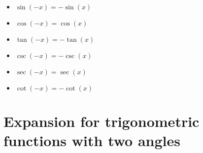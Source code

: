 \documentclass{article}
\begin{document}
\begin{itemize}
\item $\sin(-x) = -\sin(x)$
\item $\cos(-x) = \cos(x)$
\item $\tan(-x) = -\tan(x)$
\item $\csc(-x) = -\csc(x)$
\item $\sec(-x) = \sec(x)$
\item $\cot(-x) = -\cot(x)$
\end{itemize}

\maketitle
\section{Expansion for trigonometric functions with two angles}
\end{document}
